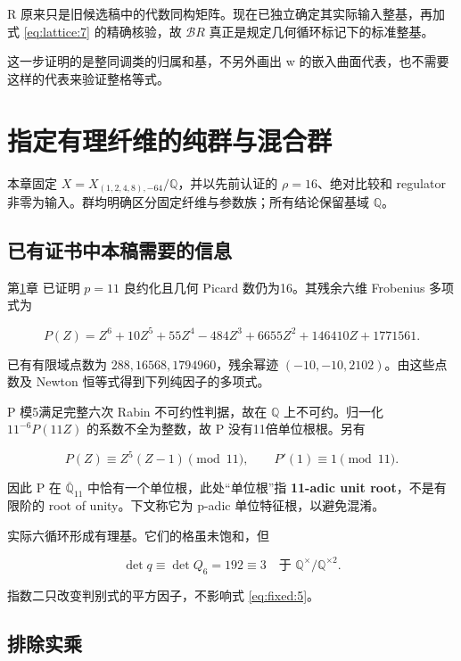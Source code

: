 \documentclass[11pt,a4paper,oneside]{ctexrep}
\theoremstyle{cnplain}
\theoremstyle{definition}
\theoremstyle{remark}
\newcommand{\Q}{\mathbb Q}
\begin{document}
R 原来只是旧候选稿中的代数同构矩阵。现在已独立确定其实际输入整基，再加式 \eqref{eq:lattice:7} 的精确核验，故 \(\mathcal B R\) 真正是规定几何循环标记下的标准整基。

这一步证明的是整同调类的归属和基，不另外画出 w 的嵌入曲面代表，也不需要这样的代表来验证整格等式。


\chapter{指定有理纤维的纯群与混合群}\label{ch:fixed}
本章固定 $X=X_{(1,2,4,8),-64}/\Q$，并以先前认证的 $\rho=16$、绝对比较和 regulator 非零为输入。群均明确区分固定纤维与参数族；所有结论保留基域 $\Q$。
\section{已有证书中本稿需要的信息}\label{sec:fixed:1}

第\ref{ch:fixed}章 已证明 \(p=11\) 良约化且几何 Picard 数仍为16。其残余六维 Frobenius 多项式为

\begin{equation}
P(Z)=Z^6+10Z^5+55Z^4-484Z^3+6655Z^2+146410Z+1771561.             \label{eq:fixed:3}
\end{equation}

已有有限域点数为 \(288,16568,1794960\)，残余幂迹 \((-10,-10,2102)\)。由这些点数及 Newton 恒等式得到下列纯因子的多项式。

P 模5满足完整六次 Rabin 不可约性判据，故在 \(\mathbb Q\) 上不可约。归一化 \(11^{-6}P(11Z)\) 的系数不全为整数，故 P 没有11倍单位根根。另有

\begin{equation}
P(Z)\equiv Z^5(Z-1)\pmod {11},\qquad P'(1)\equiv1\pmod {11}.     \label{eq:fixed:4}
\end{equation}

因此 P 在 \(\overline{\mathbb Q}_{11}\) 中恰有一个单位根，此处``单位根''指 \textbf{11-adic unit root}，不是有限阶的 root of unity。下文称它为 p-adic 单位特征根，以避免混淆。

实际六循环形成有理基。它们的格虽未饱和，但

\begin{equation}
\det q\equiv\det Q_6=192\equiv3
 \quad\text{于 }\mathbb Q^\times/\mathbb Q^{\times2}.             \label{eq:fixed:5}
\end{equation}

指数二只改变判别式的平方因子，不影响式 \eqref{eq:fixed:5}。

\section{排除实乘}\label{sec:fixed:2}
\end{document}
